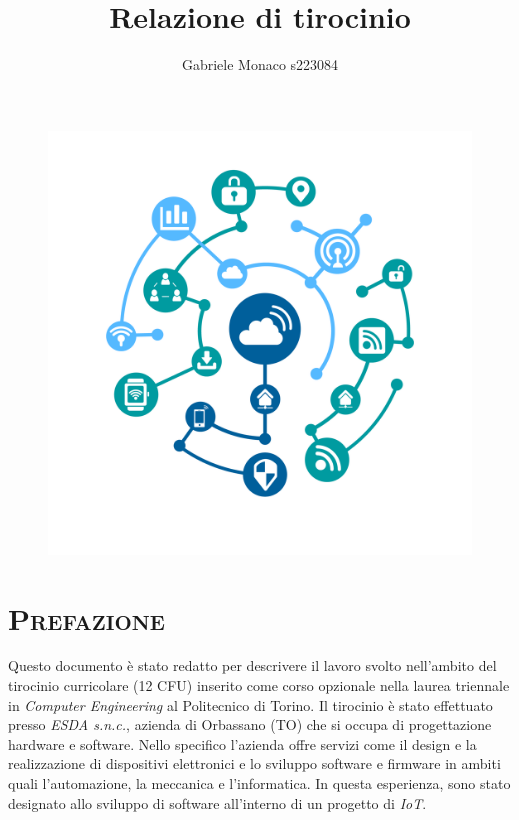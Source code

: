 \documentclass[a4paper,12pt]{article}
\title{\textbf{Relazione di tirocinio}}
\author{Gabriele Monaco s223084}
\begin{document}
\pagestyle{fancy}
\fancyhf{}
\lhead{\thetitle}
\rhead{\theauthor}
\cfoot{\thepage}


\maketitle

\begin{figure}[h]
  \includegraphics[width=\textwidth]{header}
\end{figure}

\thispagestyle{first}

\newpage

\tableofcontents

\newpage

\setlength{\emergencystretch}{15pt}
\setlength{\parindent}{0pt}
\renewcommand{\headrulewidth}{1sp}

\section{\textsc{Prefazione}}

Questo documento \`e stato redatto per descrivere il lavoro svolto nell'ambito del tirocinio curricolare (12 CFU) inserito come corso opzionale nella laurea triennale in \textit{Computer Engineering} al Politecnico di Torino. Il tirocinio \`e stato effettuato presso \textit{ESDA s.n.c.}, azienda di Orbassano (TO) che si occupa di progettazione hardware e software. Nello specifico l'azienda offre servizi come il design e la realizzazione di dispositivi elettronici e lo sviluppo software e firmware in ambiti quali l'automazione, la meccanica e l'informatica. In questa esperienza, sono stato designato allo sviluppo di software all'interno di un progetto di \textit{IoT}.
\end{document}
